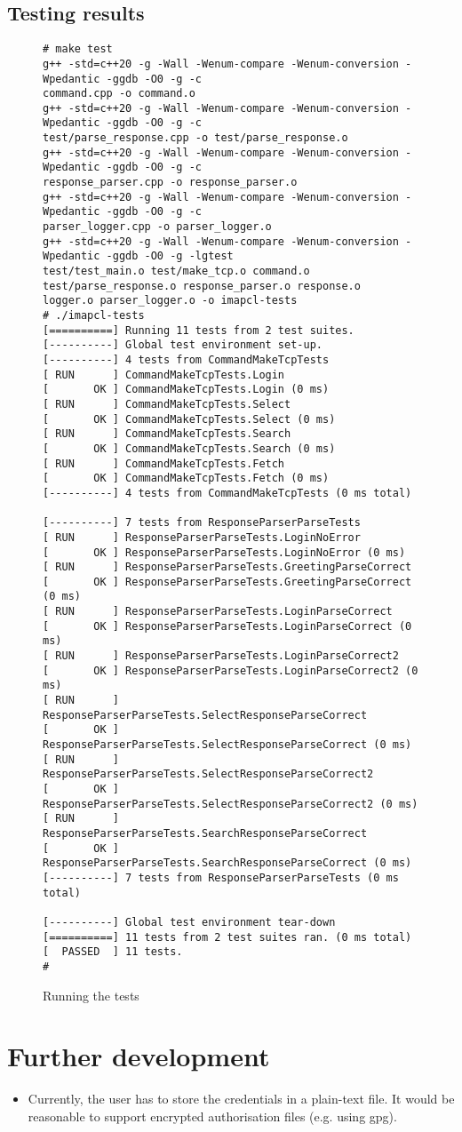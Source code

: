 \documentclass[a4]{report}
\begin{document}
\section{Testing results}

\begin{figure}
\begin{verbatim}
# make test
g++ -std=c++20 -g -Wall -Wenum-compare -Wenum-conversion -Wpedantic -ggdb -O0 -g -c
command.cpp -o command.o
g++ -std=c++20 -g -Wall -Wenum-compare -Wenum-conversion -Wpedantic -ggdb -O0 -g -c
test/parse_response.cpp -o test/parse_response.o
g++ -std=c++20 -g -Wall -Wenum-compare -Wenum-conversion -Wpedantic -ggdb -O0 -g -c
response_parser.cpp -o response_parser.o
g++ -std=c++20 -g -Wall -Wenum-compare -Wenum-conversion -Wpedantic -ggdb -O0 -g -c
parser_logger.cpp -o parser_logger.o
g++ -std=c++20 -g -Wall -Wenum-compare -Wenum-conversion -Wpedantic -ggdb -O0 -g -lgtest
test/test_main.o test/make_tcp.o command.o test/parse_response.o response_parser.o response.o
logger.o parser_logger.o -o imapcl-tests
# ./imapcl-tests
[==========] Running 11 tests from 2 test suites.
[----------] Global test environment set-up.
[----------] 4 tests from CommandMakeTcpTests
[ RUN      ] CommandMakeTcpTests.Login
[       OK ] CommandMakeTcpTests.Login (0 ms)
[ RUN      ] CommandMakeTcpTests.Select
[       OK ] CommandMakeTcpTests.Select (0 ms)
[ RUN      ] CommandMakeTcpTests.Search
[       OK ] CommandMakeTcpTests.Search (0 ms)
[ RUN      ] CommandMakeTcpTests.Fetch
[       OK ] CommandMakeTcpTests.Fetch (0 ms)
[----------] 4 tests from CommandMakeTcpTests (0 ms total)

[----------] 7 tests from ResponseParserParseTests
[ RUN      ] ResponseParserParseTests.LoginNoError
[       OK ] ResponseParserParseTests.LoginNoError (0 ms)
[ RUN      ] ResponseParserParseTests.GreetingParseCorrect
[       OK ] ResponseParserParseTests.GreetingParseCorrect (0 ms)
[ RUN      ] ResponseParserParseTests.LoginParseCorrect
[       OK ] ResponseParserParseTests.LoginParseCorrect (0 ms)
[ RUN      ] ResponseParserParseTests.LoginParseCorrect2
[       OK ] ResponseParserParseTests.LoginParseCorrect2 (0 ms)
[ RUN      ] ResponseParserParseTests.SelectResponseParseCorrect
[       OK ] ResponseParserParseTests.SelectResponseParseCorrect (0 ms)
[ RUN      ] ResponseParserParseTests.SelectResponseParseCorrect2
[       OK ] ResponseParserParseTests.SelectResponseParseCorrect2 (0 ms)
[ RUN      ] ResponseParserParseTests.SearchResponseParseCorrect
[       OK ] ResponseParserParseTests.SearchResponseParseCorrect (0 ms)
[----------] 7 tests from ResponseParserParseTests (0 ms total)

[----------] Global test environment tear-down
[==========] 11 tests from 2 test suites ran. (0 ms total)
[  PASSED  ] 11 tests.
#
\end{verbatim}
\caption{Running the tests}
\end{figure}


\chapter{Further development}

\begin{itemize}
  \item Currently, the user has to store the credentials in a plain-text file. It would be reasonable to support encrypted authorisation files (e.g. using gpg).
\end{itemize}

\printbibliography
\end{document}
